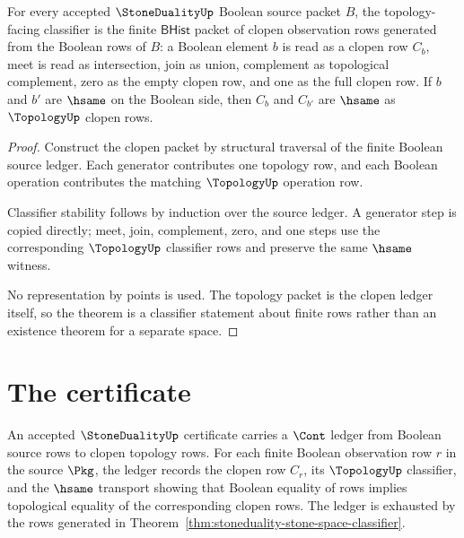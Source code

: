 \begin{theorem}\label{thm:stoneduality-stone-space-classifier}
For every accepted $\StoneDualityUp$ Boolean source packet $B$, the topology-facing classifier is the finite $\mathsf{BHist}$ packet of clopen observation rows generated from the Boolean rows of $B$: a Boolean element $b$ is read as a clopen row $C_b$, meet is read as intersection, join as union, complement as topological complement, zero as the empty clopen row, and one as the full clopen row. If $b$ and $b'$ are $\hsame$ on the Boolean side, then $C_b$ and $C_{b'}$ are $\hsame$ as $\TopologyUp$ clopen rows.
\end{theorem}

\begin{proof}
Construct the clopen packet by structural traversal of the finite Boolean source ledger. Each generator contributes one topology row, and each Boolean operation contributes the matching $\TopologyUp$ operation row.

Classifier stability follows by induction over the source ledger. A generator step is copied directly; meet, join, complement, zero, and one steps use the corresponding $\TopologyUp$ classifier rows and preserve the same $\hsame$ witness.

No representation by points is used. The topology packet is the clopen ledger itself, so the theorem is a classifier statement about finite rows rather than an existence theorem for a separate space.
\end{proof}

\section{The certificate}
\label{sec:stoneduality-certificate}

\begin{theorem}\label{thm:stoneduality-clopen-ledger}
An accepted $\StoneDualityUp$ certificate carries a $\Cont$ ledger from Boolean source rows to clopen topology rows. For each finite Boolean observation row $r$ in the source $\Pkg$, the ledger records the clopen row $C_r$, its $\TopologyUp$ classifier, and the $\hsame$ transport showing that Boolean equality of rows implies topological equality of the corresponding clopen rows. The ledger is exhausted by the rows generated in Theorem~\ref{thm:stoneduality-stone-space-classifier}.
\end{theorem}

